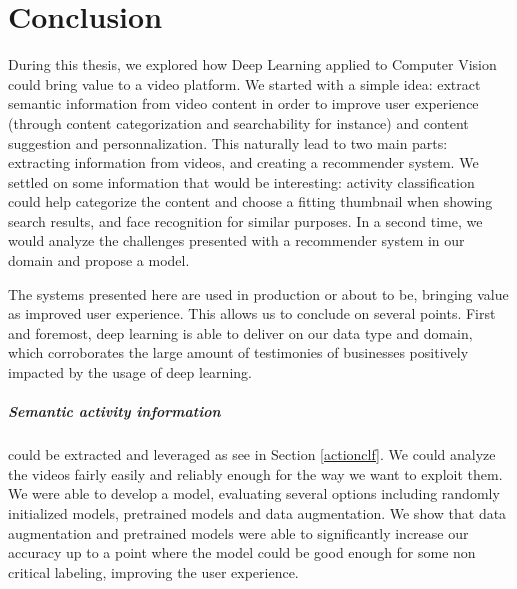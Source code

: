 \chapter{Conclusion}

During this thesis, we explored how Deep Learning applied to Computer Vision could bring value to a video platform. We started with a simple idea: extract semantic information from video content in order to improve user experience (through content categorization and searchability for instance) and content suggestion and personnalization. This naturally lead to two main parts: extracting information from videos, and creating a recommender system. We settled on some information that would be interesting: activity classification could help categorize the content and choose a fitting thumbnail when showing search results, and face recognition for similar purposes. In a second time, we would analyze the challenges presented with a recommender system in our domain and propose a model.

The systems presented here are used in production or about to be, bringing value as improved user experience. This allows us to conclude on several points. First and foremost, deep learning is able to deliver on our data type and domain, which corroborates the large amount of testimonies of businesses positively impacted by the usage of deep learning.

\paragraph{Semantic activity information} could be extracted and leveraged as see in Section \ref{actionclf}. We could analyze the videos fairly easily and reliably enough for the way we want to exploit them. We were able to develop a model, evaluating several options including randomly initialized models, pretrained models and data augmentation. We show that data augmentation and pretrained models were able to significantly increase our accuracy up to a point where the model could be good enough for some non critical labeling, improving the user experience.

